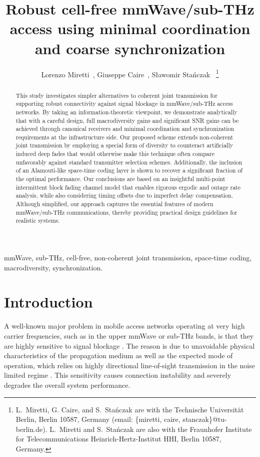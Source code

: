 \documentclass[10pt,journal,a4paper]{IEEEtran}
\author{Lorenzo Miretti~\IEEEmembership{Member,~IEEE}, Giuseppe Caire~\IEEEmembership{Fellow,~IEEE}, Sławomir Sta\'nczak~\IEEEmembership{Senior Member,~IEEE}
\thanks{L.~Miretti, G. Caire, and S.~Sta\'nczak are with the Technische Universität Berlin, Berlin 10587, Germany (email: \{miretti, caire, stanczak\}@tu-berlin.de). L.~Miretti and S.~Sta\'nczak are also with the Fraunhofer Institute for Telecommunications Heinrich-Hertz-Institut HHI, Berlin 10587, Germany. %
}}
\title{Robust cell-free mmWave/sub-THz access using minimal coordination and coarse synchronization}
\begin{document}
\maketitle


\begin{abstract}
This study investigates simpler alternatives to coherent joint transmission for supporting robust connectivity against signal blockage in mmWave/sub-THz access networks. By taking an information-theoretic viewpoint, we demonstrate analytically that with a careful design, full macrodiversity gains and significant SNR gains can be achieved through canonical receivers and minimal coordination and synchronization requirements at the infrastructure side. Our proposed scheme extends non-coherent joint transmission by employing a special form of diversity to counteract artificially induced deep fades that would otherwise make this technique often compare unfavorably against standard transmitter selection schemes. Additionally, the inclusion of an Alamouti-like space-time coding layer is shown to recover a significant fraction of the optimal performance. Our conclusions are based on an insightful multi-point intermittent block fading channel model that enables rigorous ergodic and outage rate analysis, while also considering timing offsets due to imperfect delay compensation. Although simplified, our approach captures the essential features of modern mmWave/sub-THz communications, thereby providing practical design guidelines for realistic systems. 
\end{abstract}
\begin{IEEEkeywords}
mmWave, sub-THz, cell-free, non-coherent joint transmission, space-time coding, macrodiversity, synchronization.
\end{IEEEkeywords}


\section{Introduction}
A well-known major problem in mobile access networks operating at very high carrier frequencies, such as in the upper mmWave or sub-THz bands, is that they are highly sensitive to signal blockage \cite{keusgen2016shadowing,rappaport2017fading,sundeep2018blockage}. The reason is due to unavoidable physical characteristics of the propagation medium as well as the expected mode of operation, which relies on highly directional line-of-sight transmission in the noise limited regime \cite{rappaport2015wideband,song2020fully,miretti2023little}. This sensitivity causes connection instability and severely degrades the overall system performance. 
\end{document}
